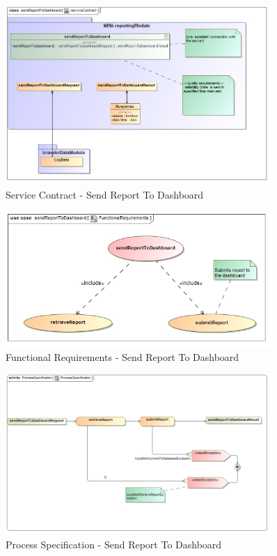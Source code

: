 \documentclass[hidelinks, 12pt, oneside]{article}
\begin{document}
		
		\begin{figure}[!htbp]
    		\centering
    		\includegraphics[width=0.9\textwidth]{img/serviceContractSendReportToDashboard.jpg}
    		\caption{Service Contract - Send Report To Dashboard}
    		\label{fig:ServiceCon_submitReport}
		\end{figure}
		\newpage	
			
		\begin{figure}[!htbp]
    		\centering
    		\includegraphics[width=0.9\textwidth]{img/functionalRequirementsSendReportToDashboard.jpg}
    		\caption{Functional Requirements - Send Report To Dashboard}
    		\label{fig:FunctionalReq_submitReport}
		\end{figure}
		
		
		\begin{figure}[!htbp]
    		\centering
    		\includegraphics[width=0.9\textwidth]{img/ProcessSpecificationSendResportToDashboard.jpg}
    		\caption{Process Specification - Send Report To Dashboard}
    		\label{fig:ProcessSpec_submitReport}
		\end{figure}
\newpage

\newpage	
\end{document}
